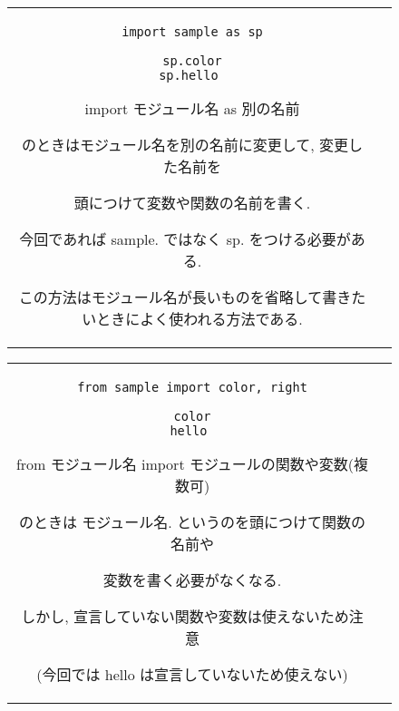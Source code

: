\documentclass{jsarticle}
\begin{document}
\begin{figure}[h]
	\begin{tabular}{cc}
		\begin{minipage}[t]{.4\textwidth}
			\begin{lstlisting}[caption=インポートの仕方-その2]
import sample as sp

sp.color
sp.hello \end{lstlisting}
		\end{minipage} \hspace{5mm}
		\begin{minipage}[t]{.6\textwidth}
			\begin{screen}
				import モジュール名 as 別の名前 \par
				のときはモジュール名を別の名前に変更して, 変更した名前を\par 頭につけて変数や関数の名前を書く.  \par
				今回であれば sample. ではなく sp. をつける必要がある.  \par
				この方法はモジュール名が長いものを省略して書きたいときによく使われる方法である.
			\end{screen}
		\end{minipage}
	\end{tabular}
\end{figure}

\begin{figure}[h]
	\begin{tabular}{cc}
		\begin{minipage}[t]{.4\textwidth}
			\begin{lstlisting}[caption=インポートの仕方-その3]
from sample import color, right

color
hello \end{lstlisting}
		\end{minipage} \hspace{5mm}
		\begin{minipage}[t]{.6\textwidth}
			\begin{screen}
				from モジュール名 import モジュールの関数や変数(複数可) \par
				のときは モジュール名. というのを頭につけて関数の名前や\par 変数を書く必要がなくなる. \par
				しかし, 宣言していない関数や変数は使えないため注意\par (今回では hello は宣言していないため使えない)
			\end{screen}
		\end{minipage}
	\end{tabular}
\end{figure}
\end{document}
